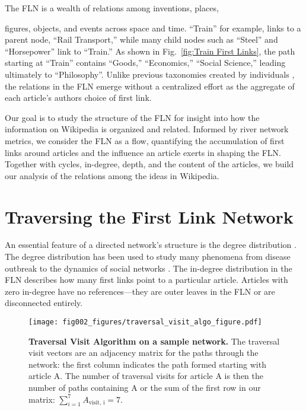 \documentclass[pre,twocolumn,twoside,superscriptaddress,floatfix]{revtex4-1}
\begin{document}
The FLN is a wealth of relations among inventions, places,
{figures, objects, and events across space and time.
``Train'' for example, links to a parent node, ``Rail Transport,''
while many child nodes such as ``Steel'' and ``Horsepower'' link to ``Train.''
As shown in Fig.~\ref{fig:Train First Links}, the path starting at ``Train'' 
contains ``Goods,'' ``Economics,'' ``Social Science,''
leading ultimately to ``Philosophy''.
Unlike previous taxonomies created by individuals
\cite{Bolton2007, descartes, aristotle, hist_thesaurus},
the relations in the FLN emerge without a centralized effort 
as the aggregate of each article's authors choice of first link.

Our goal is to study the structure of the FLN for insight into how the information on Wikipedia is organized and related.
Informed by river network metrics,
we consider the FLN as a flow, quantifying 
the accumulation of first links around articles 
and the influence an article exerts in shaping the FLN.
Together with cycles, in-degree, depth, and the content of the articles, 
we build our analysis of the relations among the ideas in Wikipedia.

\section{Traversing the First Link Network}
\label{Traversal Algorithm}

An essential feature of a directed network's structure is the degree distribution 
\cite{newman2003structure}. 
The degree distribution has been used to study many phenomena from disease outbreak 
\cite{eubank2004modelling} 
to the dynamics of social networks 
\cite{newman2002random}.
The in-degree distribution in the FLN describes how many first links point to a 
particular article. 
Articles with zero in-degree have no references---they are outer leaves in the FLN 
or are disconnected entirely. 

\begin{figure*}[tp!]
  \texttt{[image: fig002\_figures/traversal\_visit\_algo\_figure.pdf]}  
  \caption{
    \textbf{Traversal Visit Algorithm on a sample network.}
     The traversal visit vectors are an adjacency matrix for the paths through the network: 
     the first column indicates the path formed starting with article A. 
     The number of traversal visits for article A is then the number of paths containing A 
     or the sum of the first row in our matrix:
     $\sum_{i=1}^7 A_{\text{visit, i}} = 7$.
  }
  \label{fig:Traversal Visits}
\end{figure*}

}
\end{document}
